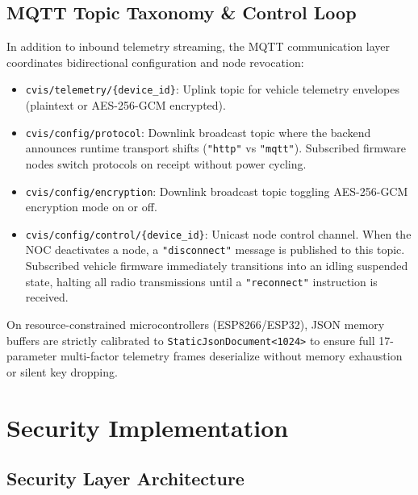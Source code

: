 \documentclass[12pt,a4paper]{report}
\begin{document}
\section{MQTT Topic Taxonomy \& Control Loop}

In addition to inbound telemetry streaming, the MQTT communication layer coordinates bidirectional configuration and node revocation:

\begin{itemize}
  \item \texttt{cvis/telemetry/\{device\_id\}}: Uplink topic for vehicle telemetry envelopes (plaintext or AES-256-GCM encrypted).
  \item \texttt{cvis/config/protocol}: Downlink broadcast topic where the backend announces runtime transport shifts (\texttt{"http"} vs \texttt{"mqtt"}). Subscribed firmware nodes switch protocols on receipt without power cycling.
  \item \texttt{cvis/config/encryption}: Downlink broadcast topic toggling AES-256-GCM encryption mode on or off.
  \item \texttt{cvis/config/control/\{device\_id\}}: Unicast node control channel. When the NOC deactivates a node, a \texttt{"disconnect"} message is published to this topic. Subscribed vehicle firmware immediately transitions into an idling suspended state, halting all radio transmissions until a \texttt{"reconnect"} instruction is received.
\end{itemize}

On resource-constrained microcontrollers (ESP8266/ESP32), JSON memory buffers are strictly calibrated to \texttt{StaticJsonDocument<1024>} to ensure full 17-parameter multi-factor telemetry frames deserialize without memory exhaustion or silent key dropping.

\chapter{Security Implementation}

\section{Security Layer Architecture}
\end{document}
